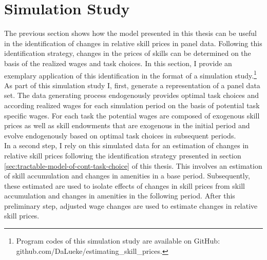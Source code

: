 \documentclass[../main.tex]{subfiles}
\begin{document}
\section{Simulation Study}\label{sec:simulation_study}
The previous section shows how the model presented in this thesis can be useful in the identification of changes in relative skill prices in panel data. Following this identification strategy, changes in the prices of skills can be determined on the basis of the realized wages and task choices. In this section, I provide an exemplary application of this identification in the format of a simulation study.\footnote{Program codes of this simulation study are available on GitHub: github.com/DaLueke/estimating\_skill\_prices.}
\\
As part of this simulation study I, first, generate a representation of a panel data set. The data generating process endogenously provides optimal task choices and according realized wages for each simulation period on the basis of potential task specific wages. For each task the potential wages are composed of exogenous skill prices as well as  skill endowments that are exogenous in the initial period and evolve endogenously based on optimal task choices in subsequent periods.
\\
In a second step, I rely on this simulated data for an estimation of changes in relative skill prices following the identification strategy presented in section \ref{sec:tractable-model-of-cont-task-choice} of this thesis. This involves an estimation of skill accumulation and changes in amenities in a base period. Subsequently, these estimated are used to isolate effects of changes in skill prices from skill accumulation and changes in amenities in the following period. After this preliminary step, adjusted wage changes are used to estimate changes in relative skill prices.
\end{document}
